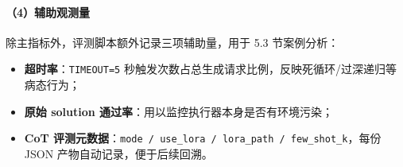 \paragraph{（4）辅助观测量}
除主指标外，评测脚本额外记录三项辅助量，用于 5.3 节案例分析：
\begin{itemize}
    \item \textbf{超时率}：\texttt{TIMEOUT=5} 秒触发次数占总生成请求比例，反映死循环/过深递归等病态行为；
    \item \textbf{原始 solution 通过率}：用以监控执行器本身是否有环境污染；
    \item \textbf{CoT 评测元数据}：\texttt{mode / use\_lora / lora\_path / few\_shot\_k}，每份 JSON 产物自动记录，便于后续回溯。
\end{itemize}
